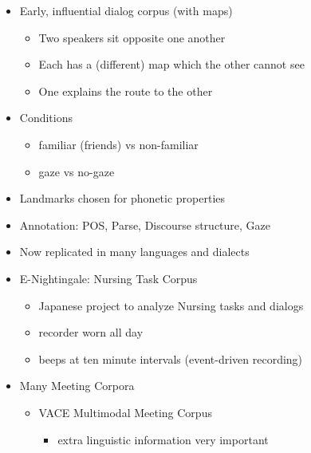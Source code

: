 \documentclass[a4paper,landscape,headrule,footrule,dvips]{foils}
\begin{document}
\begin{CJK}{UTF8}{min}
\begin{itemize}
\item Early, influential dialog corpus (with maps)
  \begin{itemize}
  \item Two speakers sit opposite one another
  \item Each has a (different) map which the other cannot see
  \item One explains the route to the other
  \end{itemize}
\item Conditions
  \begin{itemize}
  \item familiar (friends) vs non-familiar
  \item gaze vs no-gaze
  \end{itemize}
\item Landmarks chosen for phonetic properties
\item Annotation: POS, Parse, Discourse structure, Gaze
\item Now replicated in many languages and dialects
\end{itemize}

\MyLogo{}
\begin{itemize}
\item E-Nightingale: Nursing Task Corpus
\begin{itemize}
\item Japanese project to analyze Nursing tasks and dialogs
\item recorder worn all day
\item beeps at ten minute intervals  (event-driven recording)
\end{itemize}
\item Many Meeting Corpora
  \begin{itemize}
  \item VACE Multimodal Meeting Corpus
    \begin{itemize}
    \item extra linguistic information very important
    \end{itemize}
  \end{itemize}
\end{itemize}  


\end{CJK}
\end{document}
